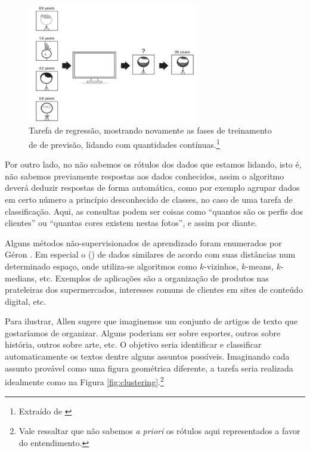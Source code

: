 \begin{figure}[htb]
\centering
\includegraphics[width=7.5cm]{figuras/regressao}
\caption{Tarefa de regressão, mostrando novamente as fases de treinamento de de previsão, lidando com quantidades contínuas.\footnote{Extraído de \citep{allen}}}
\label{fig:regressao}
\end{figure}

Por outro lado, no  não sabemos os rótulos dos dados que estamos lidando, isto é, não sabemos previamente respostas aos dados conhecidos, assim o algoritmo deverá deduzir respostas de forma automática, como por exemplo agrupar dados em certo número a princípio desconhecido de classes, no caso de uma tarefa de classificação. Aqui, as consultas podem ser coisas como ``quantos são os perfis dos clientes'' ou ``quantas cores existem nestas fotos'', e assim por diante.

Alguns métodos não-supervisionados de aprendizado foram enumerados por Géron \citep{hands}. Em especial o  () de dados similares de acordo com suas distâncias num determinado espaço, onde utiliza-se algoritmos como $k$-vizinhos, $k$-means, $k$-medians, etc. Exemplos de aplicações são a organização de produtos nas prateleiras dos supermercados, interesses comuns de clientes em sites de conteúdo digital, etc.

Para ilustrar, Allen \citep{allen} sugere que imaginemos um conjunto de artigos de texto que gostaríamos de organizar. Alguns poderiam ser sobre esportes, outros sobre história, outros sobre arte, etc. O objetivo seria identificar e classificar automaticamente os textos dentre alguns assuntos possíveis. Imaginando cada assunto provável como uma figura geométrica diferente, a tarefa seria realizada idealmente como na Figura \ref{fig:clustering}.\footnote{Vale ressaltar que não sabemos \emph{a priori} os rótulos aqui representados a favor do entendimento.}

